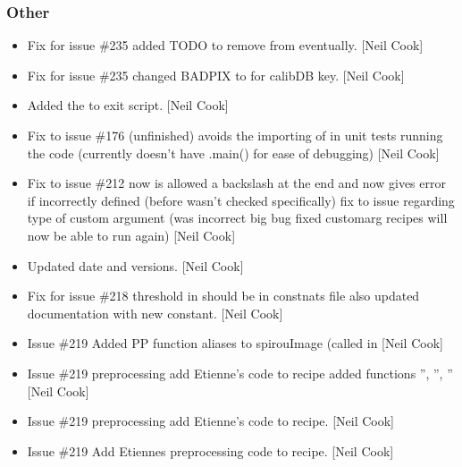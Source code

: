 \documentclass[a4paper,10pt,english]{report}
\begin{document}
\subsubsection{Other}
\label{\detokenize{misc/changelog:other}}\begin{itemize}
\item {} 
Fix for issue \#235 \sphinxhyphen{} added TODO to remove from  eventually.
{[}Neil Cook{]}

\item {} 
Fix for issue \#235 changed BADPIX to  for calibDB key. {[}Neil
Cook{]}

\item {} 
Added the  to exit script. {[}Neil Cook{]}

\item {} 
Fix to issue \#176 (unfinished) \sphinxhyphen{} avoids the importing of  in
unit tests running the code (currently doesn’t have .main() for ease
of debugging) {[}Neil Cook{]}

\item {} 
Fix to issue \#212 \sphinxhyphen{}  now is allowed a backslash at the end
and now gives error if incorrectly defined (before wasn’t checked
specifically) fix to issue regarding type of custom argument (was
incorrect \sphinxhyphen{} big bug fixed \sphinxhyphen{} customarg recipes will now be able to run
again) {[}Neil Cook{]}

\item {} 
Updated date and versions. {[}Neil Cook{]}

\item {} 
Fix for issue \#218 \sphinxhyphen{} threshold in  should be in
constnats file \sphinxhyphen{} also updated documentation with new constant. {[}Neil
Cook{]}

\item {} 
Issue \#219 \sphinxhyphen{} Added PP function aliases to spirouImage (called in
 {[}Neil Cook{]}

\item {} 
Issue \#219 \sphinxhyphen{} pre\sphinxhyphen{}processing add Etienne’s code to recipe\sphinxhyphen{} added
functions ”, ”,
” {[}Neil Cook{]}

\item {} 
Issue \#219 \sphinxhyphen{} pre\sphinxhyphen{}processing add Etienne’s code to recipe. {[}Neil Cook{]}

\item {} 
Issue \#219 \sphinxhyphen{} Add Etiennes pre\sphinxhyphen{}processing code to recipe. {[}Neil Cook{]}

\end{itemize}
\end{document}
